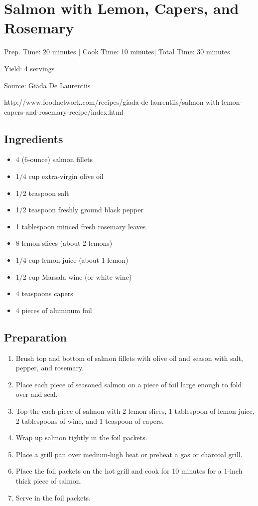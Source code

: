 \section{Salmon with Lemon, Capers, and Rosemary}

\begin{center}
Prep. Time: 20 minutes |
Cook Time: 10 minutes|
Total Time: 30 minutes
 
Yield: 4 servings

\vspace{1em}

Source: Giada De Laurentiis\par
http://www.foodnetwork.com/recipes/giada-de-laurentiis/salmon-with-lemon-capers-and-rosemary-recipe/index.html
\end{center}

\subsection{Ingredients}
\begin{itemize}

    \item 4 (6-ounce) salmon fillets
    \item 1/4 cup extra-virgin olive oil
    \item 1/2 teaspoon salt
    \item 1/2 teaspoon freshly ground black pepper
    \item 1 tablespoon minced fresh rosemary leaves
    \item 8 lemon slices (about 2 lemons)
    \item 1/4 cup lemon juice (about 1 lemon)
    \item 1/2 cup Marsala wine (or white wine)
    \item 4 teaspoons capers
    \item 4 pieces of aluminum foil

\end{itemize}

\subsection{Preparation}
\begin{enumerate}
    \item Brush top and bottom of salmon fillets with olive oil and season with salt, pepper, and rosemary.
    \item Place each piece of seasoned salmon on a piece of foil large enough to fold over and seal.
    \item Top the each piece of salmon with 2 lemon slices, 1 tablespoon of lemon juice, 2 tablespoons
          of wine, and 1 teaspoon of capers.
    \item Wrap up salmon tightly in the foil packets.
    
    \item Place a grill pan over medium-high heat or preheat a gas or charcoal grill.
    \item Place the foil packets on the hot grill and cook for 10 minutes for a 1-inch thick piece of salmon.
    \item Serve in the foil packets.
\end{enumerate}

